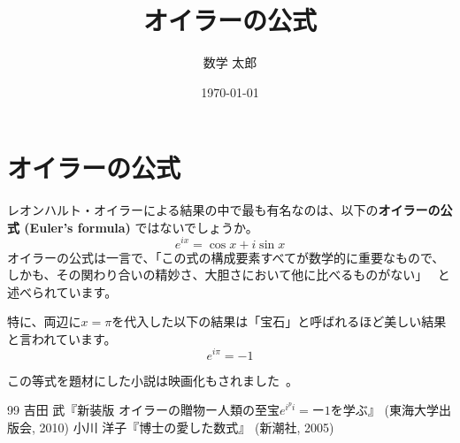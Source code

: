 \documentclass{ltjsarticle}
\title{オイラーの公式}
\author{数学 太郎}
\date{\today}
\begin{document}
\section{オイラーの公式}
レオンハルト・オイラーによる結果の中で最も有名なのは、以下の\textbf{オイラーの公式 (Euler's formula) }ではないでしょうか。
\[ e^{ix} = \cos{x} + i\sin{x} \]
オイラーの公式は一言で、「この式の構成要素すべてが数学的に重要なもので、しかも、その関わり合いの精妙さ、大胆さにおいて他に比べるものがない」 ~\cite{贈物}と述べられています。

特に、両辺に$x=\pi$を代入した以下の結果は「宝石」と呼ばれるほど美しい結果と言われています。
\[ e^{i\pi} = -1 \]

この等式を題材にした小説は映画化もされました~\cite{博士}。

\begin{thebibliography}{99}
 吉田 武『新装版 オイラーの贈物ー人類の至宝$e^{i^pi}=ー1$を学ぶ』 (東海大学出版会, 2010)
 小川 洋子『博士の愛した数式』 (新潮社, 2005)
\end{thebibliography}
\end{document}
